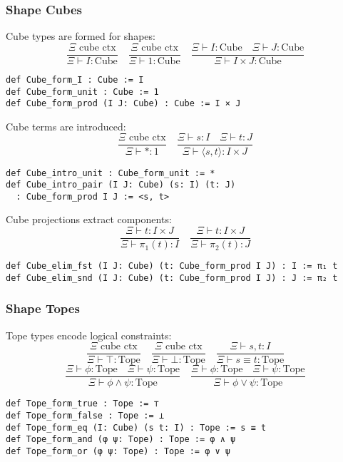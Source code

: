 \documentclass{article}
\begin{document}
\newpage
\subsubsection{Shape Cubes}

\begin{definition}
Cube types are formed for shapes:
\[
\frac{\Xi \text{ cube ctx}}{\Xi \vdash I : \text{Cube}} \quad \frac{\Xi \text{ cube ctx}}{\Xi \vdash 1 : \text{Cube}} \quad \frac{\Xi \vdash I : \text{Cube} \quad \Xi \vdash J : \text{Cube}}{\Xi \vdash I \times J : \text{Cube}}
\]
\begin{lstlisting}[mathescape=true]
def Cube_form_I : Cube := I
def Cube_form_unit : Cube := 1
def Cube_form_prod (I J: Cube) : Cube := I × J
\end{lstlisting}
\end{definition}

\begin{definition}
Cube terms are introduced:
\[
\frac{\Xi \text{ cube ctx}}{\Xi \vdash * : 1} \quad \frac{\Xi \vdash s : I \quad \Xi \vdash t : J}{\Xi \vdash \langle s, t \rangle : I \times J}
\]
\begin{lstlisting}[mathescape=true]
def Cube_intro_unit : Cube_form_unit := *
def Cube_intro_pair (I J: Cube) (s: I) (t: J)
  : Cube_form_prod I J := <s, t>
\end{lstlisting}
\end{definition}

\begin{definition}
Cube projections extract components:
\[
\frac{\Xi \vdash t : I \times J}{\Xi \vdash \pi_1(t) : I} \quad \frac{\Xi \vdash t : I \times J}{\Xi \vdash \pi_2(t) : J}
\]
\begin{lstlisting}[mathescape=true]
def Cube_elim_fst (I J: Cube) (t: Cube_form_prod I J) : I := π₁ t
def Cube_elim_snd (I J: Cube) (t: Cube_form_prod I J) : J := π₂ t
\end{lstlisting}
\end{definition}

\newpage
\subsubsection{Shape Topes}

\begin{definition}
Tope types encode logical constraints:
\[
\frac{\Xi \text{ cube ctx}}{\Xi \vdash \top : \text{Tope}} \quad \frac{\Xi \text{ cube ctx}}{\Xi \vdash \bot : \text{Tope}} \quad \frac{\Xi \vdash s, t : I}{\Xi \vdash s \equiv t : \text{Tope}}
\]
\[
\frac{\Xi \vdash \phi : \text{Tope} \quad \Xi \vdash \psi : \text{Tope}}{\Xi \vdash \phi \wedge \psi : \text{Tope}} \quad \frac{\Xi \vdash \phi : \text{Tope} \quad \Xi \vdash \psi : \text{Tope}}{\Xi \vdash \phi \vee \psi : \text{Tope}}
\]
\begin{lstlisting}[mathescape=true]
def Tope_form_true : Tope := ⊤
def Tope_form_false : Tope := ⊥
def Tope_form_eq (I: Cube) (s t: I) : Tope := s ≡ t
def Tope_form_and (φ ψ: Tope) : Tope := φ ∧ ψ
def Tope_form_or (φ ψ: Tope) : Tope := φ ∨ ψ
\end{lstlisting}
\end{definition}
\end{document}

